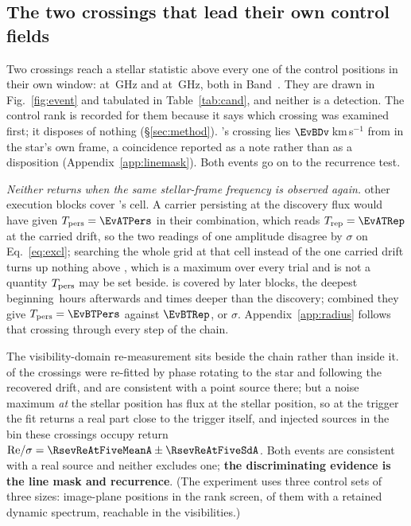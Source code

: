 \subsection{The two crossings that lead their own control fields}
\label{sec:vistest}

Two crossings reach a stellar statistic above every one of the \NCtrl{}
control positions in their own window: \EvAStar{} at \EvAFreq\,GHz and
\EvBStar{} at \EvBFreq\,GHz, both in Band~\EvABand. They are drawn in
Fig.~\ref{fig:event} and tabulated in Table~\ref{tab:cand}, and neither is a
detection. The control rank is recorded for them because it says which
crossing was examined first; it disposes of nothing (\S\ref{sec:method}).
\EvBStar's crossing lies $\EvBDv$\,km\,s$^{-1}$ from \EvBLine{} in the star's
own frame, a coincidence reported as a note rather than as a disposition
(Appendix~\ref{app:linemask}). Both events go on to the recurrence test.

\emph{Neither returns when the same stellar-frame frequency is observed
again.} \EvANRep{} other execution blocks cover \EvAStar's cell. A carrier
persisting at the discovery flux would have given $T_{\rm pers}=\EvATPers$ in
their combination, which reads $T_{\rm rep}=\EvATRep$ at the carried drift, so
the two readings of one amplitude disagree by \EvAExcl$\sigma$ on
Eq.~\ref{eq:excl}; searching the whole grid at that cell instead of the one
carried drift turns up nothing above \EvATAnyDrift, which is a maximum over
every trial and is not a quantity $T_{\rm pers}$ may be set beside.
\EvBStar{} is covered by \RcCpNRep{} later blocks, the deepest beginning
\EvBNearH\,hours afterwards and \EvBDeepRatio{} times deeper than the
discovery; combined they give $T_{\rm pers}=\EvBTPers$ against $\EvBTRep$,
or \EvBExcl$\sigma$. Appendix~\ref{app:radius} follows that crossing through
every step of the chain.

The visibility-domain re-measurement sits beside the chain rather than inside
it. \LgNFit{} of the \NCross{} crossings were re-fitted by phase rotating to
the star and following the recovered drift, and \LgNLocalCor{} are consistent
with a point source there; but a noise maximum \emph{at} the stellar position
has flux at the stellar position, so at the trigger the fit returns a real
part close to the trigger itself, and injected sources in the bin these
crossings occupy return
${\rm Re}/\sigma=\RsevReAtFiveMeanA\pm\RsevReAtFiveSdA$. Both events are
consistent with a real source and neither excludes one; \textbf{the
discriminating evidence is the line mask and recurrence}. (The experiment uses three control
sets of three sizes: \NCtrl{} image-plane positions in the rank screen,
\RcNRetCtrl{} of them with a retained dynamic spectrum, \RcNVisCtrl{}
reachable in the visibilities.)

